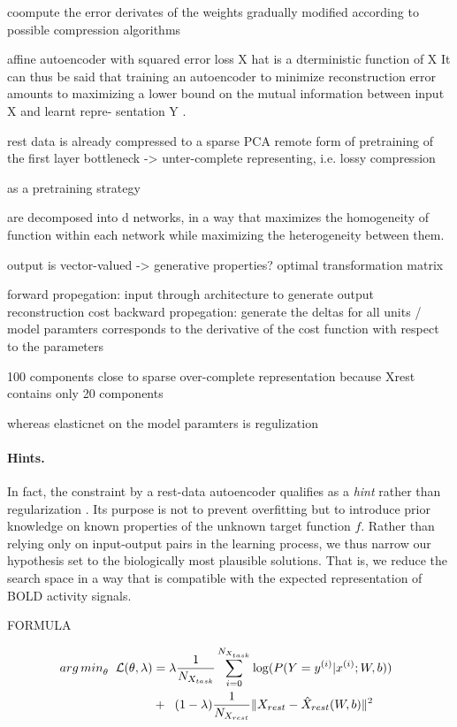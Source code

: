 \documentclass{article} %
\begin{document}
coompute the error derivates of the weights
gradually modified according to possible compression algorithms


affine autoencoder with squared error loss
X hat is a dterministic function of X
It can thus be said that training an autoencoder to minimize reconstruction error amounts to maximizing a lower bound on the mutual information between input X and learnt repre- sentation Y .

rest data is already compressed to a sparse PCA remote form of 
pretraining of the first layer
bottleneck -> unter-complete representing, i.e. lossy compression

as a pretraining strategy

are decomposed into d networks,
in a way that maximizes the homogeneity of
function within each network while maximizing the heterogeneity between them.

output is vector-valued -> generative properties?
optimal transformation matrix 

forward propegation: input through architecture to generate output
reconstruction cost
backward propegation: generate the deltas for all units / model paramters
corresponds to the derivative of the cost function with respect to the parameters



100 components close to sparse over-complete representation because
Xrest contains only 20 components

whereas elasticnet on the model paramters is regulization

\paragraph{Hints.}
In fact, the constraint by a rest-data autoencoder qualifies as a
\textit{hint} rather than regularization \cite{abu1994hints}.
Its purpose is not to prevent overfitting but to introduce
prior knowledge on known properties of the unknown target function $f$.
Rather than relying only on input-output pairs in the learning process,
we thus narrow our hypothesis set to the biologically most plausible solutions.
That is, we reduce the search space in a way that
is compatible with the expected representation of BOLD activity signals.




FORMULA

\begin{eqnarray}
  \begin{split}
{arg\,min}_\theta \hspace{0.2cm} {\mathcal{L}}(\theta, \lambda) &= \lambda\frac{1}{N_{X_{task}}} \sum_{i=0}^{N_{X_{task}}} \log(P(Y=y^{(i)}|x^{(i)}; W,b)) \hspace{0.2cm} \\
&+ \hspace{0.2cm} (1-\lambda)\frac{1}{N_{X_{rest}}}\|X_{rest}-\hat X_{rest}(W,b)\|^2
  \end{split}
  \label{eq:loss_equ}
\end{eqnarray}
\end{document}
